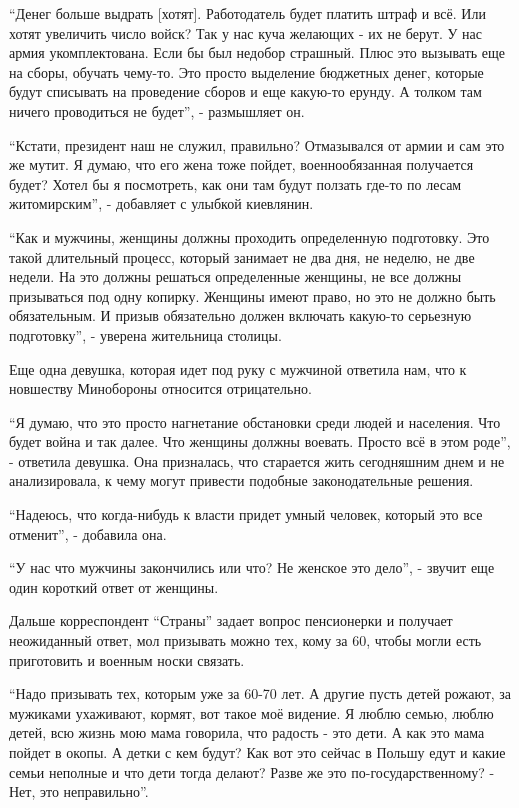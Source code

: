 \begin{multicols}{2}
\enquote{Денег больше выдрать [хотят]. Работодатель будет платить штраф и всё. Или
хотят увеличить число войск? Так у нас куча желающих - их не берут. У нас армия
укомплектована. Если бы был недобор страшный. Плюс это вызывать еще на сборы,
обучать чему-то. Это просто выделение бюджетных денег, которые будут списывать
на проведение сборов и еще какую-то ерунду. А толком там ничего проводиться не
будет}, - размышляет он. 

\enquote{Кстати, президент наш не служил, правильно? Отмазывался от армии и сам это же
мутит. Я думаю, что его жена тоже пойдет, военнообязанная получается будет?
Хотел бы я посмотреть, как они там будут ползать где-то по лесам житомирским},
- добавляет с улыбкой киевлянин.


\enquote{Как и мужчины, женщины должны проходить определенную подготовку. Это такой
длительный процесс, который занимает не два дня, не неделю, не две недели. На
это должны решаться определенные женщины, не все должны призываться под одну
копирку. Женщины имеют право, но это не должно быть обязательным. И призыв
обязательно должен включать какую-то серьезную подготовку}, - уверена
жительница столицы.


Еще одна девушка, которая идет под руку с мужчиной ответила нам, что к
новшеству Минобороны относится отрицательно.

\enquote{Я думаю, что это просто нагнетание обстановки среди людей и населения. Что
будет война и так далее. Что женщины должны воевать. Просто всё в этом роде}, -
ответила девушка. Она призналась, что старается жить сегодняшним днем и не
анализировала, к чему могут привести подобные законодательные решения.

\enquote{Надеюсь, что когда-нибудь к власти придет умный человек, который это все
отменит}, - добавила она.


\enquote{У нас что мужчины закончились или что? Не женское это дело}, - звучит еще один
короткий ответ от женщины.

Дальше корреспондент \enquote{Страны} задает вопрос пенсионерки и получает неожиданный
ответ, мол призывать можно тех, кому за 60, чтобы могли есть приготовить и
военным носки связать. 

\enquote{Надо призывать тех, которым уже за 60-70 лет. А другие пусть детей рожают, за
мужиками ухаживают, кормят, вот такое моё видение. Я люблю семью, люблю детей,
всю жизнь мою мама говорила, что радость - это дети. А как это мама пойдет в
окопы. А детки с кем будут? Как вот это сейчас в Польшу едут и какие семьи
неполные и что дети тогда делают? Разве же это по-государственному? - Нет, это
неправильно}.


\end{multicols}
